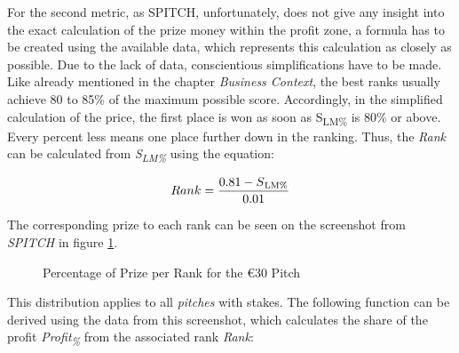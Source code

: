 For the second metric, as SPITCH, unfortunately, does not give any insight into the exact calculation of the prize money within the profit zone, a formula has to be created using the available data, which represents this calculation as closely as possible. Due to the lack of data, conscientious simplifications have to be made. Like already mentioned in the chapter \emph{Business Context}, the best ranks usually achieve 80 to 85\% of the maximum possible score. Accordingly, in the simplified calculation of the price, the first place is won as soon as S\textsubscript{LM\%} is 80\% or above. Every percent less means one place further down in the ranking. Thus, the \emph{Rank} can be calculated from \emph{S\textsubscript{LM\%}} using the equation:

\begin{equation}
    Rank = \frac{0.81 - S\textsubscript{LM\%}}{0.01} 
    \label{eq:percentage_of_best_score_to_rank}
\end{equation}

The corresponding prize to each rank can be seen on the screenshot from \emph{SPITCH} in figure \ref{fig:prize-percentage}.

\begin{figure}[H]
    \centering
    \captionsetup{justification=centering}
    \caption{Percentage of Prize per Rank for the €30 Pitch}
    \label{fig:prize-percentage}
\end{figure}

This distribution applies to all \emph{pitches} with stakes. The following function can be derived using the data from this screenshot, which calculates the share of the profit \emph{Profit\textsubscript{\%}} from the associated rank \emph{Rank}:

